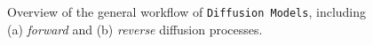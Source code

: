 \begin{figure}[t]
    \centering

    
    \caption{
    Overview of the general workflow of \texttt{Diffusion~Models}, including (a) \emph{forward} and (b) \emph{reverse} diffusion processes.
    }
    \label{fig:diffusion}
\end{figure}